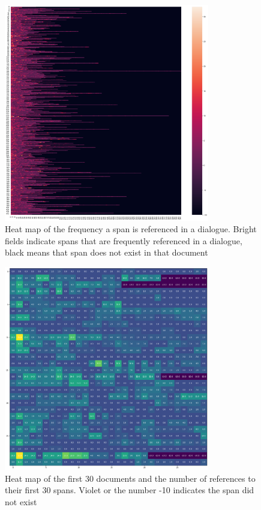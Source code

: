 \documentclass[11pt]{article}
\begin{document}
    \begin{figure}[h]
        \centering
        \includegraphics[width=0.8\textwidth]{sparsity_of_spans}
        \caption{Heat map of the frequency a span is referenced in a dialogue. Bright fields indicate spans that are frequently
        referenced in a dialogue, black means that span does not exist in that document}
        \label{fig:heat-map-all-spans}
    \end{figure}

    \begin{figure}[h]
        \centering
        \includegraphics[width=0.8\textwidth]{sub_section_usage_of_spans}
        \caption{Heat map of the first 30 documents and the number of references to their first 30 spans. Violet or the number
        -10 indicates the span did not exist}
        \label{fig:heat-map-first-30-spans}
    \end{figure}
\end{document}
